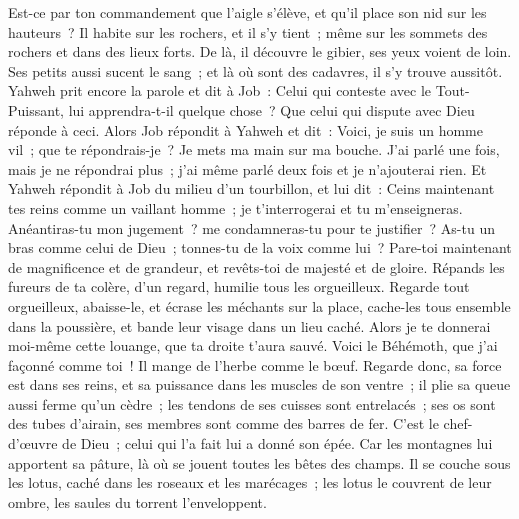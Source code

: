 \begin{multicols}{2}
Est-ce par ton commandement que l'aigle s'élève, et qu'il place son nid sur les hauteurs~?
Il habite sur les rochers, et il s'y tient~; même sur les sommets des rochers et dans des lieux forts. 
De là, il découvre le gibier, ses yeux voient de loin.
Ses petits aussi sucent le sang~; et là où sont des cadavres, il s'y trouve aussitôt.
Yahweh prit encore la parole et dit à Job~:
Celui qui conteste avec le Tout-Puissant, lui apprendra-t-il quelque chose~? Que celui qui dispute avec Dieu réponde à ceci.
Alors Job répondit à Yahweh et dit~:
Voici, je suis un homme vil~; que te répondrais-je~? Je mets ma main sur ma bouche.
J'ai parlé une fois, mais je ne répondrai plus~; j'ai même parlé deux fois et je n'ajouterai rien.
\VerseOne{}Et Yahweh répondit à Job du milieu d'un tourbillon, et lui dit~:
Ceins maintenant tes reins comme un vaillant homme~; je t'interrogerai et tu m'enseigneras.
Anéantiras-tu mon jugement~? me condamneras-tu pour te justifier~?
As-tu un bras comme celui de Dieu~; tonnes-tu de la voix comme lui~?
Pare-toi maintenant de magnificence et de grandeur, et revêts-toi de majesté et de gloire.
Répands les fureurs de ta colère, d'un regard, humilie tous les orgueilleux.
Regarde tout orgueilleux, abaisse-le, et écrase les méchants sur la place,
cache-les tous ensemble dans la poussière, et bande leur visage dans un lieu caché. 
Alors je te donnerai moi-même cette louange, que ta droite t'aura sauvé. 
Voici le Béhémoth, que j'ai façonné comme toi~! Il mange de l'herbe comme le bœuf.
Regarde donc, sa force est dans ses reins, et sa puissance dans les muscles de son ventre~;
il plie sa queue aussi ferme qu'un cèdre~; les tendons de ses cuisses sont entrelacés~;
ses os sont des tubes d'airain, ses membres sont comme des barres de fer.
C'est le chef-d'œuvre de Dieu~; celui qui l'a fait lui a donné son épée.
Car les montagnes lui apportent sa pâture, là où se jouent toutes les bêtes des champs.
Il se couche sous les lotus, caché dans les roseaux et les marécages~;
les lotus le couvrent de leur ombre, les saules du torrent l'enveloppent.

\end{multicols}
